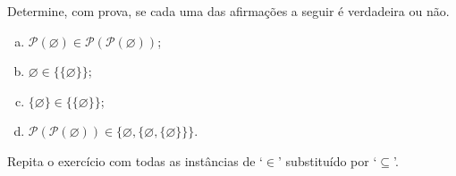 \begin{exercise}
Determine, com prova, se cada uma das afirmações a seguir é verdadeira ou não.
\begin{enumerate}[(a)]
\item $\mathcal{P}(\varnothing) \in \mathcal{P}(\mathcal{P}(\varnothing))$;
\item $\varnothing \in \{ \{ \varnothing \} \}$;
\item $\{ \varnothing \} \in \{ \{ \varnothing \} \}$;
\item $\mathcal{P}(\mathcal{P}(\varnothing)) \in \{ \varnothing, \{ \varnothing, \{ \varnothing \} \} \}$.
\end{enumerate}
Repita o exercício com todas as instâncias de `$\in$' substituído por `$\subseteq$'.
\end{exercise}

